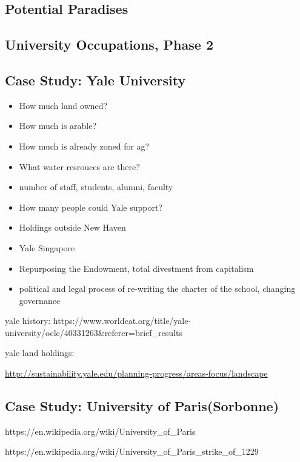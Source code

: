 \subsection{Potential Paradises}\label{potential-paradises}

\subsection{University Occupations, Phase
2}\label{university-occupations-phase-2}

\subsection{Case Study: Yale
University}\label{case-study-yale-university}

\begin{itemize}
\tightlist
\item
  How much land owned?
\item
  How much is arable?
\item
  How much is already zoned for ag?
\item
  What water resrouces are there?
\item
  number of staff, students, alumni, faculty
\item
  How many people could Yale support?
\item
  Holdings outside New Haven
\item
  Yale Singapore
\item
  Repurposing the Endowment, total divestment from capitalism
\item
  political and legal process of re-writing the charter of the school,
  changing governance
\end{itemize}

yale history:
https://www.worldcat.org/title/yale-university/oclc/40331263\&referer=brief\_results

yale land holdings:

\url{http://sustainability.yale.edu/planning-progress/areas-focus/landscape}

\subsection{Case Study: University of
Paris(Sorbonne)}\label{case-study-university-of-parissorbonne}

https://en.wikipedia.org/wiki/University\_of\_Paris

https://en.wikipedia.org/wiki/University\_of\_Paris\_strike\_of\_1229


